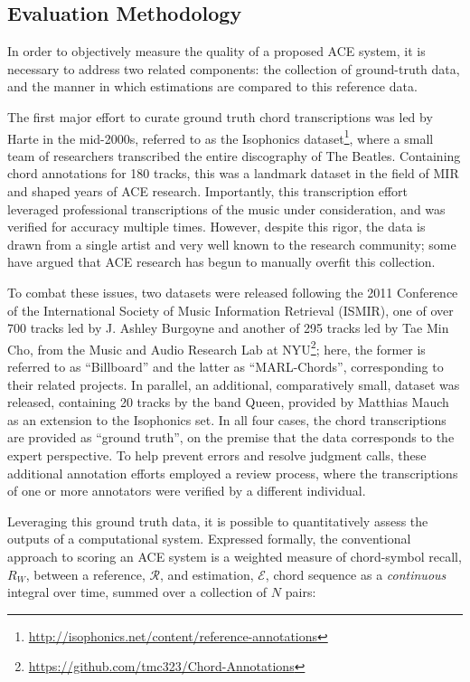 \subsection{Evaluation Methodology}
\label{subsec:eval_methodology}

In order to objectively measure the quality of a proposed ACE system, it is necessary to address two related components: the collection of ground-truth data, and the manner in which estimations are compared to this reference data.

The first major effort to curate ground truth chord transcriptions was led by Harte in the mid-2000s, referred to as the Isophonics dataset\footnote{\url{http://isophonics.net/content/reference-annotations}}, where a small team of researchers transcribed the entire discography of The Beatles.
Containing chord annotations for 180 tracks, this was a landmark dataset in the field of MIR and shaped years of ACE research.
Importantly, this transcription effort leveraged professional transcriptions of the music under consideration, and was verified for accuracy multiple times.
However, despite this rigor, the data is drawn from a single artist and very well known to the research community; some have argued that ACE research has begun to manually overfit this collection.

To combat these issues, two datasets were released following the 2011 Conference of the International Society of Music Information Retrieval (ISMIR), one of over 700 tracks led by J. Ashley Burgoyne \cite{Burgoyne2011Expert} and another of 295 tracks led by Tae Min Cho, from the Music and Audio Research Lab at NYU\footnote{\url{https://github.com/tmc323/Chord-Annotations}}; here, the former is referred to as ``Billboard'' and the latter as ``MARL-Chords'', corresponding to their related projects.
In parallel, an additional, comparatively small, dataset was released, containing 20 tracks by the band Queen, provided by Matthias Mauch as an extension to the Isophonics set.
In all four cases, the chord transcriptions are provided as ``ground truth'', on the premise that the data corresponds to the expert perspective.
To help prevent errors and resolve judgment calls, these additional annotation efforts employed a review process, where the transcriptions of one or more annotators were verified by a different individual.

Leveraging this ground truth data, it is possible to quantitatively assess the outputs of a computational system.
Expressed formally, the conventional approach to scoring an ACE system is a weighted measure of chord-symbol recall, $R_{W}$, between a reference, $\mathcal{R}$, and estimation, $\mathcal{E}$, chord sequence as a \emph{continuous} integral over time, summed over a collection of $N$ pairs:

